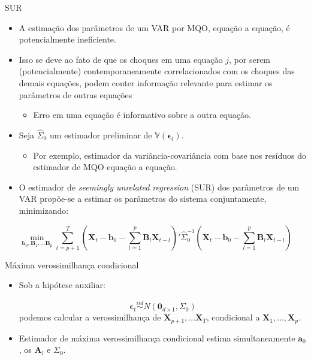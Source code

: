 \documentclass[11pt]{beamer}
\begin{document}
\begin{frame}{SUR}
	\begin{itemize}
		\item A estimação dos parâmetros de um VAR por MQO, equação a equação, é potencialmente ineficiente.
					\item Isso se deve ao fato de que os choques em uma equação $j$, por serem (potencialmente) contemporaneamente correlacionados com os choques das demais equações, podem conter informação relevante para estimar os parâmetros de outras equações
		\begin{itemize}
		\item Erro em uma equação é informativo sobre a outra equação.
		\end{itemize}
		\item Seja $\hat \Sigma_0$ um estimador preliminar de $\mathbb{V}(\boldsymbol{\epsilon}_t)$.
		\begin{itemize}
			\item Por exemplo, estimador da variância-covariância com base nos resíduos do estimador de MQO equação a equação.
		\end{itemize}
		\item O estimador de \textit{seemingly unrelated regression} (SUR) dos parâmetros de um VAR propõe-se a estimar os parâmetros do sistema {\color{blue}conjuntamente}, minimizando:
	\end{itemize}		$$\min_{\boldsymbol{b}_0, \boldsymbol{B}_1,\ldots \boldsymbol{B}_p} \sum_{t=p+1}^T \left(\boldsymbol{X}_t - \boldsymbol{b}_0 -  \sum_{l=1}^p\boldsymbol{B}_l \boldsymbol{X}_{t-l}\right)' \hat \Sigma^{-1}_0 \left(\boldsymbol{X}_t - \boldsymbol{b}_0 -  \sum_{l=1}^p\boldsymbol{B}_l \boldsymbol{X}_{t-l}\right)$$
\end{frame}
\begin{frame}{Máxima verossimilhança condicional}
\begin{itemize}
	\item Sob a hipótese auxiliar:
	
	$$\boldsymbol{\epsilon}_t \overset{iid}{\sim} N(\boldsymbol{0}_{d\times 1}, \Sigma_0)$$
	podemos calcular a verossimilhança de $\boldsymbol{X}_{p+1},\ldots \boldsymbol{X}_{T}$, condicional a $\boldsymbol{X}_1,\ldots, \boldsymbol{X}_p$.
	\item Estimador de máxima verossimilhança condicional estima {\color{blue}simultaneamente} $\boldsymbol{a}_0$, os $\boldsymbol{A}_l$  e $\Sigma_0$.
\end{itemize}
\end{frame}
\end{document}
